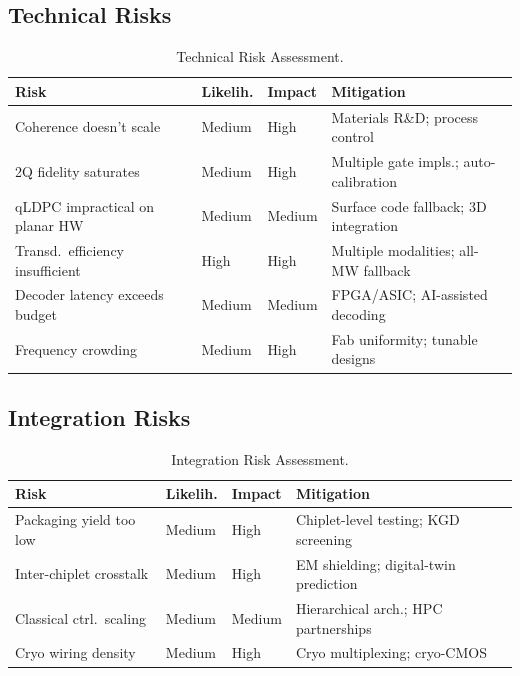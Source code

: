 \documentclass[conference]{IEEEtran}
\begin{document}
\subsection{Technical Risks}

\begin{table}[htbp]
\centering
\caption{Technical Risk Assessment.}
\label{tab:tech_risks}
\begin{tabular}{p{2cm}llp{2.3cm}}
\toprule
\textbf{Risk} & \textbf{Likelih.} & \textbf{Impact} & \textbf{Mitigation} \\
\midrule
Coherence doesn't scale & Medium & High & Materials R\&D; process control \\
2Q fidelity saturates & Medium & High & Multiple gate impls.; auto-calibration \\
qLDPC impractical on planar HW & Medium & Medium & Surface code fallback; 3D integration \\
Transd.\ efficiency insufficient & High & High & Multiple modalities; all-MW fallback \\
Decoder latency exceeds budget & Medium & Medium & FPGA/ASIC; AI-assisted decoding \\
Frequency crowding & Medium & High & Fab uniformity; tunable designs \\
\bottomrule
\end{tabular}
\end{table}

\subsection{Integration Risks}

\begin{table}[htbp]
\centering
\caption{Integration Risk Assessment.}
\label{tab:int_risks}
\begin{tabular}{p{2cm}llp{2.3cm}}
\toprule
\textbf{Risk} & \textbf{Likelih.} & \textbf{Impact} & \textbf{Mitigation} \\
\midrule
Packaging yield too low & Medium & High & Chiplet-level testing; KGD screening \\
Inter-chiplet crosstalk & Medium & High & EM shielding; digital-twin prediction \\
Classical ctrl.\ scaling & Medium & Medium & Hierarchical arch.; HPC partnerships \\
Cryo wiring density & Medium & High & Cryo multiplexing; cryo-CMOS \\
\bottomrule
\end{tabular}
\end{table}
\end{document}
